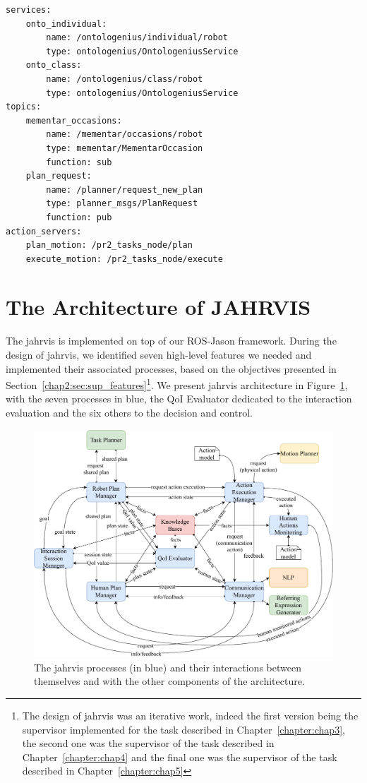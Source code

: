 \documentclass[a4paper,11pt,twoside]{StyleThese}
\begin{document}
\begin{lstlisting}[caption={Example of service, topic and action server definitions in a YAML file.}, label={chap2:lst:ros-jason}]
services:
	onto_individual: 
		name: /ontologenius/individual/robot
		type: ontologenius/OntologeniusService
	onto_class: 
		name: /ontologenius/class/robot
		type: ontologenius/OntologeniusService
topics:
	mementar_occasions: 
		name: /mementar/occasions/robot
		type: mementar/MementarOccasion
		function: sub
	plan_request:
		name: /planner/request_new_plan
		type: planner_msgs/PlanRequest
		function: pub
action_servers:
	plan_motion: /pr2_tasks_node/plan
	execute_motion: /pr2_tasks_node/execute
\end{lstlisting}


\section{The Architecture of JAHRVIS}\label{chap2:sec:jahrvis}
The \acrfull{jahrvis} is implemented on top of our ROS-Jason framework. During the design of \acrshort{jahrvis}, we identified seven high-level features we needed and implemented their associated processes, based on the objectives presented in Section~\ref{chap2:sec:sup_features}\footnote{The design of \acrshort{jahrvis} was an iterative work, indeed the first version being the supervisor implemented for the task described in Chapter~\ref{chapter:chap3}, the second one was the supervisor of the task described in Chapter~\ref{chapter:chap4} and the final one was the supervisor of the task described in Chapter~\ref{chapter:chap5}}. We present \acrshort{jahrvis} architecture in Figure~\ref{chap2:fig:sup_overview}, with the seven processes in blue, the QoI Evaluator dedicated to the interaction evaluation and the six others to the decision and control. 

\begin{figure}[!ht]
	\includegraphics[width=\linewidth]{figures/chapter2/supervisor_modules.pdf}
	\caption{The \acrshort{jahrvis} processes (in blue) and their interactions between themselves and with the other components of the architecture.}
	\label{chap2:fig:sup_overview}
\end{figure}
\end{document}
